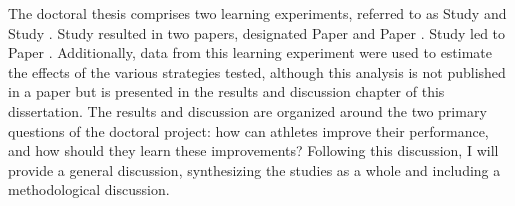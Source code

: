 The doctoral thesis comprises two learning experiments, referred to as Study  and Study . Study  resulted in two papers, designated Paper  and Paper . Study  led to Paper . Additionally, data from this learning experiment were used to estimate the effects of the various strategies tested, although this analysis is not published in a paper but is presented in the results and discussion chapter of this dissertation. The results and discussion are organized around the two primary questions of the doctoral project: how can athletes improve their performance, and how should they learn these improvements? Following this discussion, I will provide a general discussion, synthesizing the studies as a whole and including a methodological discussion.




